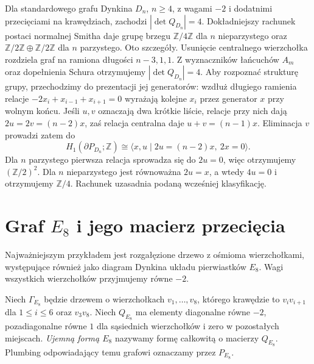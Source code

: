 \begin{uwaga}
Dla standardowego grafu Dynkina $D_n$, $n\ge4$, z wagami
$-2$ i dodatnimi przecięciami na krawędziach, zachodzi
$|\det Q_{D_n}|=4$. Dokładniejszy rachunek postaci normalnej
Smitha daje grupę brzegu $\mathbb Z/4\mathbb Z$ dla $n$
nieparzystego oraz
$\mathbb Z/2\mathbb Z\oplus\mathbb Z/2\mathbb Z$ dla $n$
parzystego. Oto szczegóły. Usunięcie centralnego wierzchołka rozdziela
graf na ramiona długości $n-3,1,1$. Z wyznaczników
łańcuchów $A_m$ oraz dopełnienia Schura otrzymujemy
$|\det Q_{D_n}|=4$. Aby rozpoznać strukturę grupy,
przechodzimy do prezentacji jej generatorów: wzdłuż długiego
ramienia relacje $-2x_i+x_{i-1}+x_{i+1}=0$ wyrażają
kolejne $x_i$ przez generator $x$ przy wolnym końcu.
Jeśli $u,v$ oznaczają dwa krótkie liście, relacje przy
nich dają $2u=2v=(n-2)x$, zaś relacja centralna daje
$u+v=(n-1)x$. Eliminacja $v$ prowadzi zatem do
\[
H_1(\partial P_{D_n};\mathbb Z)
\cong \langle x,u\mid 2u=(n-2)x,\ 2x=0\rangle.
\]
Dla $n$ parzystego pierwsza relacja sprowadza się do
$2u=0$, więc otrzymujemy $(\mathbb Z/2)^2$.
Dla $n$ nieparzystego jest równoważna $2u=x$,
a wtedy $4u=0$ i otrzymujemy $\mathbb Z/4$.
Rachunek uzasadnia podaną wcześniej klasyfikację.
\end{uwaga}

\section{Graf \texorpdfstring{$E_8$}{E8} i jego macierz przecięcia}
\label{sec:tg-plumbing-E8}

Najważniejszym przykładem jest rozgałęzione drzewo z ośmioma
wierzchołkami, występujące również jako diagram Dynkina
układu pierwiastków $E_8$. Wagi wszystkich wierzchołków
przyjmujemy równe $-2$.

\begin{definicja}
Niech $\Gamma_{E_8}$ będzie drzewem o wierzchołkach
$v_1,\ldots,v_8$, którego krawędzie to
$v_iv_{i+1}$ dla $1\le i\le6$ oraz $v_3v_8$.
Niech $Q_{E_8}$ ma elementy diagonalne równe $-2$,
pozadiagonalne równe $1$ dla sąsiednich wierzchołków
i zero w pozostałych miejscach. \emph{Ujemną formą
$E_8$} nazywamy formę całkowitą o macierzy $Q_{E_8}$.
Plumbing odpowiadający temu grafowi oznaczamy
przez $P_{E_8}$.
\end{definicja}

\begin{center}
\end{center}

